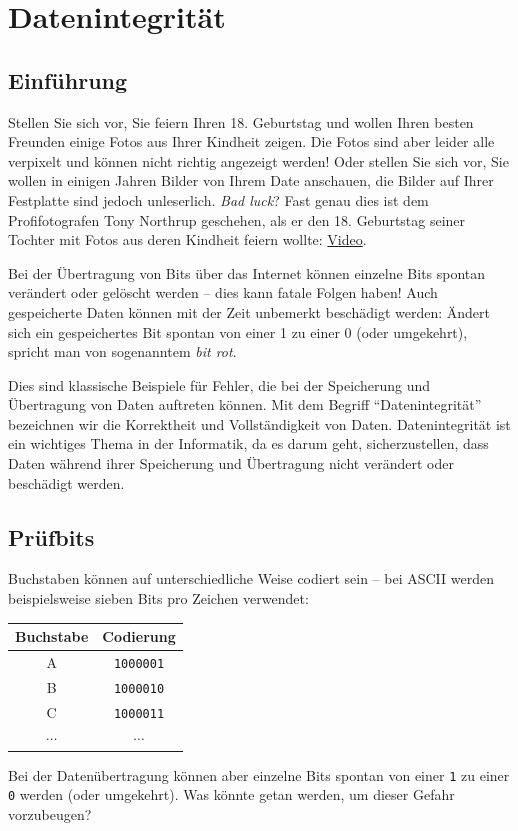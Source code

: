 \chapter{Datenintegrität}

\section{Einführung}

Stellen Sie sich vor, Sie feiern Ihren 18. Geburtstag und wollen Ihren besten Freunden einige Fotos aus Ihrer Kindheit zeigen. Die Fotos sind aber leider alle verpixelt und können nicht richtig angezeigt werden! Oder stellen Sie sich vor, Sie wollen in einigen Jahren Bilder von Ihrem Date anschauen, die Bilder auf Ihrer Festplatte sind jedoch unleserlich. \textit{Bad luck}? Fast genau dies ist dem Profifotografen Tony Northrup geschehen, als er den 18. Geburtstag seiner Tochter mit Fotos aus deren Kindheit feiern wollte: \href{https://www.youtube.com/watch?v=xvbnhCDfREk}{Video}.

Bei der Übertragung von Bits über das Internet können einzelne Bits spontan verändert oder gelöscht werden -- dies kann fatale Folgen haben! Auch gespeicherte Daten können mit der Zeit unbemerkt beschädigt werden: Ändert sich ein gespeichertes Bit spontan von einer 1 zu einer 0 (oder umgekehrt), spricht man von sogenanntem \textit{bit rot}.

Dies sind klassische Beispiele für Fehler, die bei der Speicherung und Übertragung von Daten auftreten können. Mit dem Begriff \enquote{Datenintegrität} bezeichnen wir die Korrektheit und Vollständigkeit von Daten. Datenintegrität ist ein wichtiges Thema in der Informatik, da es darum geht, sicherzustellen, dass Daten während ihrer Speicherung und Übertragung nicht verändert oder beschädigt werden.

\section{Prüfbits}

Buchstaben können auf unterschiedliche Weise codiert sein -- bei \gls{ASCII} werden beispielsweise sieben Bits pro Zeichen verwendet:

\begin{table}[H]
    \centering
    \begin{tabular}{cc}
        Buchstabe & Codierung        \\\midrule
        A         & \texttt{1000001} \\\midrule
        B         & \texttt{1000010} \\\midrule
        C         & \texttt{1000011} \\\midrule
        $\cdots$  & $\cdots$
    \end{tabular}
\end{table}
Bei der Datenübertragung können aber einzelne Bits spontan von einer \texttt{1} zu einer \texttt{0} werden (oder umgekehrt). Was könnte getan werden, um dieser Gefahr vorzubeugen?

